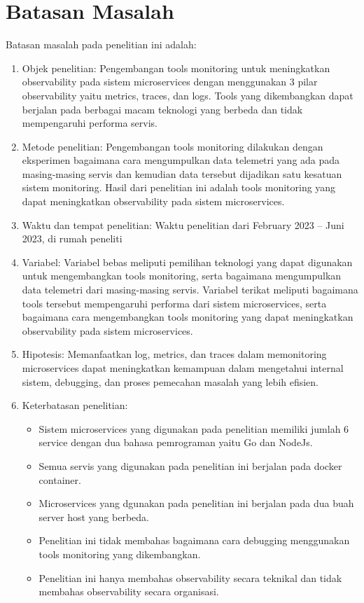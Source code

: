 \section{Batasan Masalah}
Batasan masalah pada penelitian ini adalah:
\begin{enumerate}
\item Objek penelitian: Pengembangan tools monitoring untuk meningkatkan observability pada sistem microservices dengan menggunakan 3 pilar observability yaitu metrics, traces, dan logs. Tools yang dikembangkan dapat berjalan pada berbagai macam teknologi yang berbeda dan tidak mempengaruhi performa servis.
\item Metode penelitian: Pengembangan tools monitoring dilakukan dengan eksperimen bagaimana cara mengumpulkan data telemetri yang ada pada masing-masing servis dan kemudian data tersebut dijadikan satu kesatuan sistem monitoring. Hasil dari penelitian ini adalah tools monitoring yang dapat meningkatkan observability pada sistem microservices.
\item Waktu dan tempat penelitian: Waktu penelitian dari February 2023 – Juni 2023, di rumah peneliti
\item Variabel: Variabel bebas meliputi pemilihan teknologi yang dapat digunakan untuk mengembangkan tools monitoring, serta bagaimana mengumpulkan data telemetri dari masing-masing servis. Variabel terikat meliputi bagaimana tools tersebut mempengaruhi performa dari sistem microservices, serta bagaimana cara mengembangkan tools monitoring yang dapat meningkatkan observability pada sistem microservices.
\item Hipotesis: Memanfaatkan log, metrics, dan traces dalam memonitoring microservices dapat meningkatkan kemampuan dalam mengetahui internal sistem, debugging, dan proses pemecahan masalah yang lebih efisien.
\item Keterbatasan penelitian:
\begin{itemize}
\item Sistem microservices yang digunakan pada penelitian memiliki jumlah 6 service dengan dua bahasa pemrograman yaitu Go dan NodeJs.
\item Semua servis yang digunakan pada penelitian ini berjalan pada docker container.
\item Microservices yang dgunakan pada penelitian ini berjalan pada dua buah server host yang berbeda.
\item Penelitian ini tidak membahas bagaimana cara debugging menggunakan tools monitoring yang dikembangkan.
\item Penelitian ini hanya membahas observability secara teknikal dan tidak membahas observability secara organisasi.
\end{itemize}
\end{enumerate}


